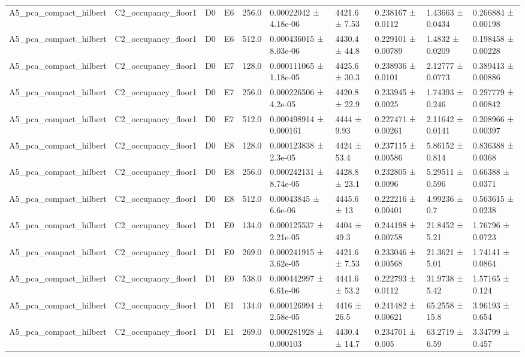 \begin{table}
\begin{tabular}{llllllllll}
A5\_pca\_compact\_hilbert & C2\_occupancy\_floor1 & D0 & E6 & 256.0 & 0.00022042 ± 4.18e-06 & 4421.6 ± 7.53 & 0.238167 ± 0.0112 & 1.43663 ± 0.0434 & 0.266884 ± 0.00198 \\
A5\_pca\_compact\_hilbert & C2\_occupancy\_floor1 & D0 & E6 & 512.0 & 0.000436015 ± 8.03e-06 & 4430.4 ± 44.8 & 0.229101 ± 0.00789 & 1.4832 ± 0.0209 & 0.198458 ± 0.00228 \\
A5\_pca\_compact\_hilbert & C2\_occupancy\_floor1 & D0 & E7 & 128.0 & 0.000111065 ± 1.18e-05 & 4425.6 ± 30.3 & 0.238936 ± 0.0101 & 2.12777 ± 0.0773 & 0.389413 ± 0.00886 \\
A5\_pca\_compact\_hilbert & C2\_occupancy\_floor1 & D0 & E7 & 256.0 & 0.000226506 ± 4.2e-05 & 4420.8 ± 22.9 & 0.233945 ± 0.0025 & 1.74393 ± 0.246 & 0.297779 ± 0.00842 \\
A5\_pca\_compact\_hilbert & C2\_occupancy\_floor1 & D0 & E7 & 512.0 & 0.000498914 ± 0.000161 & 4444 ± 9.93 & 0.227471 ± 0.00261 & 2.11642 ± 0.0141 & 0.208966 ± 0.00397 \\
A5\_pca\_compact\_hilbert & C2\_occupancy\_floor1 & D0 & E8 & 128.0 & 0.000123838 ± 2.3e-05 & 4424 ± 53.4 & 0.237115 ± 0.00586 & 5.86152 ± 0.814 & 0.836388 ± 0.0368 \\
A5\_pca\_compact\_hilbert & C2\_occupancy\_floor1 & D0 & E8 & 256.0 & 0.000242131 ± 8.74e-05 & 4428.8 ± 23.1 & 0.232805 ± 0.0096 & 5.29511 ± 0.596 & 0.66388 ± 0.0371 \\
A5\_pca\_compact\_hilbert & C2\_occupancy\_floor1 & D0 & E8 & 512.0 & 0.00043845 ± 6.6e-06 & 4445.6 ± 13 & 0.222216 ± 0.00401 & 4.99236 ± 0.7 & 0.563615 ± 0.0238 \\
A5\_pca\_compact\_hilbert & C2\_occupancy\_floor1 & D1 & E0 & 134.0 & 0.000125537 ± 2.21e-05 & 4404 ± 49.3 & 0.244198 ± 0.00758 & 21.8452 ± 5.21 & 1.76796 ± 0.0723 \\
A5\_pca\_compact\_hilbert & C2\_occupancy\_floor1 & D1 & E0 & 269.0 & 0.000241915 ± 3.62e-05 & 4421.6 ± 7.53 & 0.233046 ± 0.00568 & 21.3621 ± 5.01 & 1.74141 ± 0.0864 \\
A5\_pca\_compact\_hilbert & C2\_occupancy\_floor1 & D1 & E0 & 538.0 & 0.000442997 ± 6.61e-06 & 4441.6 ± 53.2 & 0.222793 ± 0.0112 & 31.9738 ± 5.42 & 1.57165 ± 0.124 \\
A5\_pca\_compact\_hilbert & C2\_occupancy\_floor1 & D1 & E1 & 134.0 & 0.000126994 ± 2.58e-05 & 4416 ± 26.5 & 0.241482 ± 0.00621 & 65.2558 ± 15.8 & 3.96193 ± 0.654 \\
A5\_pca\_compact\_hilbert & C2\_occupancy\_floor1 & D1 & E1 & 269.0 & 0.000281928 ± 0.000103 & 4430.4 ± 14.7 & 0.234701 ± 0.005 & 63.2719 ± 6.59 & 3.34799 ± 0.457 \\

\end{tabular}
\end{table}
